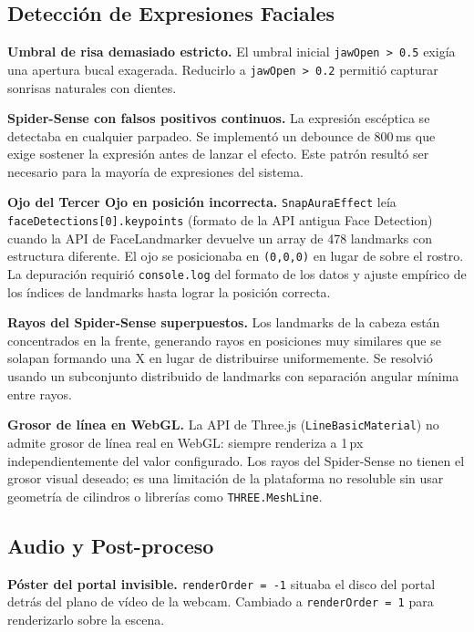 \documentclass[11pt]{article}
\begin{document}
\subsection{Detección de Expresiones Faciales}

\textbf{Umbral de risa demasiado estricto.} El umbral inicial \texttt{jawOpen > 0.5} exigía una apertura bucal exagerada. Reducirlo a \texttt{jawOpen > 0.2} permitió capturar sonrisas naturales con dientes.

\textbf{Spider-Sense con falsos positivos continuos.} La expresión escéptica se detectaba en cualquier parpadeo. Se implementó un debounce de 800\,ms que exige sostener la expresión antes de lanzar el efecto. Este patrón resultó ser necesario para la mayoría de expresiones del sistema.

\textbf{Ojo del Tercer Ojo en posición incorrecta.} \texttt{SnapAuraEffect} leía \texttt{faceDetections[0].keypoints} (formato de la API antigua Face Detection) cuando la API de FaceLandmarker devuelve un array de 478 landmarks con estructura diferente. El ojo se posicionaba en \texttt{(0,0,0)} en lugar de sobre el rostro. La depuración requirió \texttt{console.log} del formato de los datos y ajuste empírico de los índices de landmarks hasta lograr la posición correcta.

\textbf{Rayos del Spider-Sense superpuestos.} Los landmarks de la cabeza están concentrados en la frente, generando rayos en posiciones muy similares que se solapan formando una X en lugar de distribuirse uniformemente. Se resolvió usando un subconjunto distribuido de landmarks con separación angular mínima entre rayos.

\textbf{Grosor de línea en WebGL.} La API de Three.js (\texttt{LineBasicMaterial}) no admite grosor de línea real en WebGL: siempre renderiza a 1\,px independientemente del valor configurado. Los rayos del Spider-Sense no tienen el grosor visual deseado; es una limitación de la plataforma no resoluble sin usar geometría de cilindros o librerías como \texttt{THREE.MeshLine}.

\subsection{Audio y Post-proceso}

\textbf{Póster del portal invisible.} \texttt{renderOrder = -1} situaba el disco del portal detrás del plano de vídeo de la webcam. Cambiado a \texttt{renderOrder = 1} para renderizarlo sobre la escena.
\end{document}
